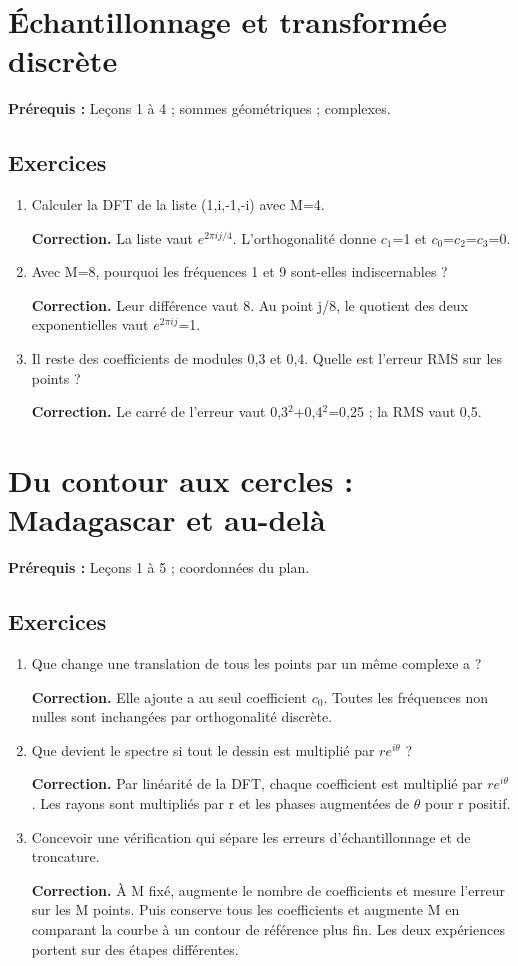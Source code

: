 \documentclass[11pt,a4paper]{article}
\begin{document}
\section{Échantillonnage et transformée discrète}
\textbf{Prérequis :} Leçons 1 à 4 ; sommes géométriques ; complexes.
\subsection*{Exercices}\begin{enumerate}
\item Calculer la DFT de la liste (1,i,-1,-i) avec M=4.
\par\textbf{Correction.} La liste vaut $e^{2\pi ij/4}$. L’orthogonalité donne $c_1$=1 et $c_0$=$c_2$=$c_3$=0.
\item Avec M=8, pourquoi les fréquences 1 et 9 sont-elles indiscernables ?
\par\textbf{Correction.} Leur différence vaut 8. Au point j/8, le quotient des deux exponentielles vaut $e^{2\pi ij}$=1.
\item Il reste des coefficients de modules 0,3 et 0,4. Quelle est l’erreur RMS sur les points ?
\par\textbf{Correction.} Le carré de l’erreur vaut 0,3$^2$+0,4$^2$=0,25 ; la RMS vaut 0,5.
\end{enumerate}
\clearpage
\section{Du contour aux cercles : Madagascar et au-delà}
\textbf{Prérequis :} Leçons 1 à 5 ; coordonnées du plan.
\subsection*{Exercices}\begin{enumerate}
\item Que change une translation de tous les points par un même complexe a ?
\par\textbf{Correction.} Elle ajoute a au seul coefficient $c_0$. Toutes les fréquences non nulles sont inchangées par orthogonalité discrète.
\item Que devient le spectre si tout le dessin est multiplié par $re^{i\theta}$ ?
\par\textbf{Correction.} Par linéarité de la DFT, chaque coefficient est multiplié par $re^{i\theta}$. Les rayons sont multipliés par r et les phases augmentées de $\theta$ pour r positif.
\item Concevoir une vérification qui sépare les erreurs d’échantillonnage et de troncature.
\par\textbf{Correction.} À M fixé, augmente le nombre de coefficients et mesure l’erreur sur les M points. Puis conserve tous les coefficients et augmente M en comparant la courbe à un contour de référence plus fin. Les deux expériences portent sur des étapes différentes.
\end{enumerate}
\clearpage
\end{document}
